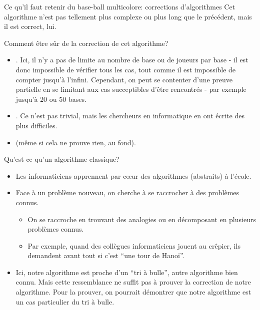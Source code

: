 \begin{frame}{Ce qu'il faut retenir du base-ball multicolore: corrections d'algorithmes}
  Cet algorithme n'est pas tellement plus complexe ou plus long que le
  précédent, mais il est correct, lui.

  \begin{block}{Comment être sûr de la \alert{correction} de cet algorithme?}
    \begin{itemize}
    \item {}. Ici, il n'y a pas de limite au nombre de base ou de joueurs par base - il est donc impossible de vérifier tous les cas, tout comme il est impossible de compter jusqu'à l'infini. Cependant, on peut se contenter d'une preuve partielle en se limitant aux cas succeptibles d'être rencontrés - par exemple jusqu'à 20 ou 50 bases.
    \item {}. Ce n'est pas trivial, mais les chercheurs en informatique en ont écrite des plus difficiles.
    \item {} (même si cela ne prouve rien, au fond).
    \end{itemize}
  \end{block}

  \begin{block}{Qu'est ce qu'un \alert{algorithme classique}?}
    \begin{itemize}
    \item Les informaticiens apprennent par cœur des algorithmes (abstraits) à l'école.
    \item Face à un problème nouveau, on cherche à se raccrocher à des problèmes connus.
      \begin{itemize}
      \item On se raccroche en trouvant des analogies ou en décomposant en plusieurs problèmes connus.
      \item Par exemple, quand des collègues informaticiens jouent au crêpier, ils demandent avant tout si c'est ``une tour de Hanoï''.
      \end{itemize}
    \item Ici, notre algorithme est proche d'un ``tri à bulle'', autre algorithme bien connu. Mais cette ressemblance ne suffit pas à prouver la correction de notre algorithme. Pour la prouver, on pourrait démontrer que notre algorithme est un cas particulier du tri à bulle.
    \end{itemize}
  \end{block}


\end{frame}
